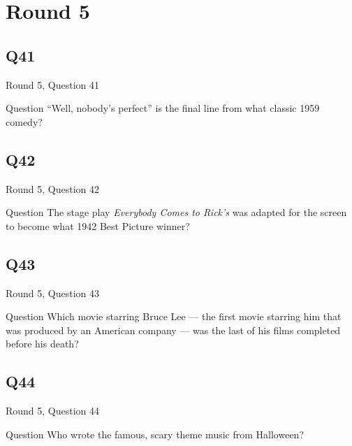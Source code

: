 \documentclass[11pt]{beamer}
\begin{document}
\section{Round 5}
    

\subsection*{Q41}
\begin{frame}[t]{Round 5, Question 41}
\vspace{2em}
\begin{block}{Question}
``Well, nobody's perfect'' is the final line from what classic 1959 comedy?
\end{block}
\end{frame}
    

\subsection*{Q42}
\begin{frame}[t]{Round 5, Question 42}
\vspace{2em}
\begin{block}{Question}
The stage play \emph{Everybody Comes to Rick's} was adapted for the screen to become what 1942 Best Picture winner?
\end{block}
\end{frame}
    

\subsection*{Q43}
\begin{frame}[t]{Round 5, Question 43}
\vspace{2em}
\begin{block}{Question}
Which movie starring Bruce Lee — the first movie starring him that was produced by an American company — was the last of his films completed before his death?
\end{block}
\end{frame}
    

\subsection*{Q44}
\begin{frame}[t]{Round 5, Question 44}
\vspace{2em}
\begin{block}{Question}
Who wrote the famous, scary theme music from Halloween?
\end{block}
\end{frame}
    
\end{document}
